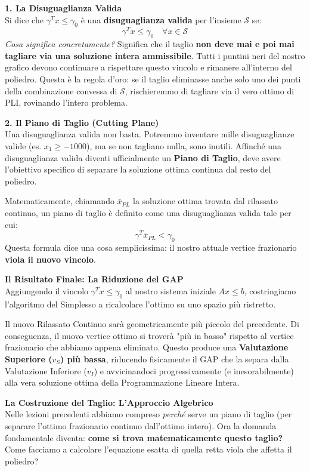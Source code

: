 \documentclass[12pt, a4paper]{article}
\begin{document}
	\textbf{1. La Disuguaglianza Valida}\\
	Si dice che $\gamma^T x \leq \gamma_0$ è una \textbf{disuguaglianza valida} per l'insieme $\mathcal{S}$ se:
	\[
	\gamma^T x \leq \gamma_0 \quad \forall x \in \mathcal{S}
	\]
	\textit{Cosa significa concretamente?} Significa che il taglio \textbf{non deve mai e poi mai tagliare via una soluzione intera ammissibile}. Tutti i puntini neri del nostro grafico devono continuare a rispettare questo vincolo e rimanere all'interno del poliedro. Questa è la regola d'oro: se il taglio eliminasse anche solo uno dei punti della combinazione convessa di $\mathcal{S}$, rischieremmo di tagliare via il vero ottimo di PLI, rovinando l'intero problema.
	
	\textbf{2. Il Piano di Taglio (Cutting Plane)}\\
	Una disuguaglianza valida non basta. Potremmo inventare mille disuguaglianze valide (es. $x_1 \geq -1000$), ma se non tagliano nulla, sono inutili. 
	Affinché una disuguaglianza valida diventi ufficialmente un \textbf{Piano di Taglio}, deve avere l'obiettivo specifico di separare la soluzione ottima continua dal resto del poliedro. 
	
	Matematicamente, chiamando $\bar{x}_{PL}$ la soluzione ottima trovata dal rilassato continuo, un piano di taglio è definito come una disuguaglianza valida tale per cui:
	\[
	\gamma^T \bar{x}_{PL} < \gamma_0
	\]
	Questa formula dice una cosa semplicissima: il nostro attuale vertice frazionario \textbf{viola il nuovo vincolo}. 
	
	\vspace{0.4cm}
	\textbf{Il Risultato Finale: La Riduzione del GAP}\\
	Aggiungendo il vincolo $\gamma^T x \leq \gamma_0$ al nostro sistema iniziale $Ax \leq b$, costringiamo l'algoritmo del Simplesso a ricalcolare l'ottimo su uno spazio più ristretto. 
	
	Il nuovo Rilassato Continuo sarà geometricamente più piccolo del precedente. Di conseguenza, il nuovo vertice ottimo si troverà "più in basso" rispetto al vertice frazionario che abbiamo appena eliminato. Questo produce una \textbf{Valutazione Superiore ($v_S$) più bassa}, riducendo fisicamente il GAP che la separa dalla Valutazione Inferiore ($v_I$) e avvicinandoci progressivamente (e inesorabilmente) alla vera soluzione ottima della Programmazione Lineare Intera.
	
	\vspace{0.6cm}
	\textbf{La Costruzione del Taglio: L'Approccio Algebrico}\\
	Nelle lezioni precedenti abbiamo compreso \textit{perché} serve un piano di taglio (per separare l'ottimo frazionario continuo dall'ottimo intero). Ora la domanda fondamentale diventa: \textbf{come si trova matematicamente questo taglio?} Come facciamo a calcolare l'equazione esatta di quella retta viola che affetta il poliedro?
	
\end{document}
